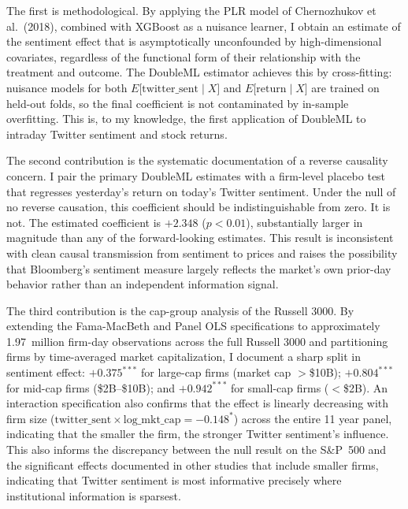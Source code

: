 The first is methodological. By applying the PLR model of
Chernozhukov et al.\ (2018), combined with XGBoost as a nuisance
learner, I obtain an estimate of the sentiment effect that is
asymptotically unconfounded by high-dimensional covariates, regardless
of the functional form of their relationship with the treatment and
outcome. The DoubleML estimator achieves this by cross-fitting: nuisance
models for both \(E\lbrack\text{twitter\_sent} \mid X\rbrack\) and
\(E\lbrack\text{return} \mid X\rbrack\) are trained on held-out folds,
so the final coefficient is not contaminated by in-sample overfitting.
This is, to my knowledge, the first application of DoubleML to intraday
Twitter sentiment and stock returns.

The second contribution is the systematic documentation of a reverse
causality concern. I pair the primary DoubleML estimates with a
firm-level placebo test that regresses yesterday's return on today's
Twitter sentiment. Under the null of no reverse causation, this
coefficient should be indistinguishable from zero. It is not. The
estimated coefficient is \(+ 2.348\) (\(p < 0.01\)), substantially
larger in magnitude than any of the forward-looking estimates. This
result is inconsistent with clean causal transmission from sentiment to
prices and raises the possibility that Bloomberg's sentiment measure
largely reflects the market's own prior-day behavior rather than an
independent information signal.

The third contribution is the cap-group analysis of the Russell 3000. By
extending the Fama-MacBeth and Panel OLS specifications to approximately
1.97~million firm-day observations across the full Russell 3000 and
partitioning firms by time-averaged market capitalization, I document a
sharp split in sentiment effect: \(+ {0.375}^{***}\) for large-cap firms
(market cap \(>\)\$10B); \(+ {0.804}^{***}\) for mid-cap firms
(\$2B--\$10B); and \(+ {0.942}^{***}\) for small-cap firms (\(<\)\$2B).
An interaction specification also confirms that the effect is linearly
decreasing with firm size
(\(\text{twitter\_sent} \times \text{log\_mkt\_cap} = - {0.148}^{*}\))
across the entire 11 year panel, indicating that the smaller the firm,
the stronger Twitter sentiment's influence. This also informs the
discrepancy between the null result on the S\&P~500 and the significant
effects documented in other studies that include smaller firms,
indicating that Twitter sentiment is most informative precisely where
institutional information is sparsest.

